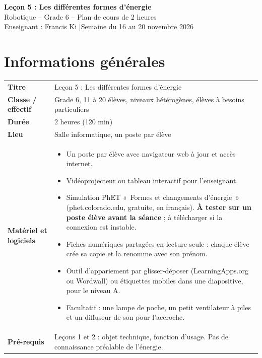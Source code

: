 \documentclass[11pt,a4paper]{article}
\begin{document}
\begin{tcolorbox}[colback=teal!10,colframe=teal!70!black,arc=2mm,boxrule=1pt]
\centering
{\LARGE\bfseries Leçon 5 : Les différentes formes d'énergie}\\[2mm]
{\large Robotique -- Grade 6 -- Plan de cours de 2 heures}\\[1mm]
Enseignant : Francis Ki \quad|\quad Semaine du 16 au 20 novembre 2026
\end{tcolorbox}

\section{Informations générales}
\begin{tabularx}{\linewidth}{>{\bfseries}p{3.6cm}Y}
\toprule
Titre & Leçon 5 : Les différentes formes d'énergie\\
Classe / effectif & Grade 6, 11 à 20 élèves, niveaux hétérogènes, élèves à besoins particuliers\\
Durée & 2 heures (120 min)\\
Lieu & Salle informatique, un poste par élève\\
Matériel et logiciels &
\begin{itemize}
 \item Un poste par élève avec navigateur web à jour et accès internet.
 \item Vidéoprojecteur ou tableau interactif pour l'enseignant.
 \item Simulation PhET «~Formes et changements d'énergie~» (phet.colorado.edu, gratuite, en français). \textbf{À tester sur un poste élève avant la séance} ; à télécharger si la connexion est instable.
 \item Fiches numériques partagées en lecture seule : chaque élève crée sa copie et la renomme avec son prénom.
 \item Outil d'appariement par glisser-déposer (LearningApps.org ou Wordwall) ou étiquettes mobiles dans une diapositive, pour le niveau A.
 \item Facultatif : une lampe de poche, un petit ventilateur à piles et un diffuseur de son pour l'accroche.
\end{itemize}\\
Pré-requis &
Leçons 1 et 2 : objet technique, fonction d'usage. Pas de connaissance préalable de l'énergie.\\
\bottomrule
\end{tabularx}
\end{document}
